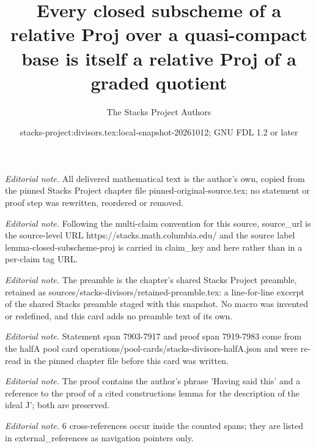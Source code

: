 \documentclass[10pt,a4paper]{amsart}
\title{Every closed subscheme of a relative Proj over a quasi-compact base is itself a relative Proj of a graded quotient}
\author{The Stacks Project Authors}
\date{stacks-project:divisors.tex:local-snapshot-20261012; GNU FDL 1.2 or later}
\theoremstyle{plain}
\theoremstyle{definition}
\theoremstyle{remark}
\numberwithin{equation}{subsection}
\begin{document}
\maketitle
\noindent\textit{Editorial note.} All delivered mathematical text is the author's own, copied from the pinned Stacks Project chapter file pinned-original-source.tex; no statement or proof step was rewritten, reordered or removed.\par\medskip
\noindent\textit{Editorial note.} Following the multi-claim convention for this source, source\_url is the source-level URL https://stacks.math.columbia.edu/ and the source label lemma-closed-subscheme-proj is carried in claim\_key and here rather than in a per-claim tag URL.\par\medskip
\noindent\textit{Editorial note.} The preamble is the chapter's shared Stacks Project preamble, retained as sources/stacks-divisors/retained-preamble.tex: a line-for-line excerpt of the shared Stacks preamble staged with this snapshot. No macro was invented or redefined, and this card adds no preamble text of its own.\par\medskip
\noindent\textit{Editorial note.} Statement span 7903-7917 and proof span 7919-7983 come from the halfA pool card operations/pool-cards/stacks-divisors-halfA.json and were re-read in the pinned chapter file before this card was written.\par\medskip
\noindent\textit{Editorial note.} The proof contains the author's phrase 'Having said this' and a reference to the proof of a cited constructions lemma for the description of the ideal J'; both are preserved.\par\medskip
\noindent\textit{Editorial note.} 6 cross-references occur inside the counted spans; they are listed in external\_references as navigation pointers only.\par\medskip
\end{document}

